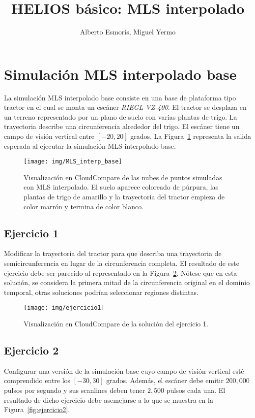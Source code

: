 \documentclass[]{article}
\title{HELIOS básico: MLS interpolado}
\author{Alberto Esmorís, Miguel Yermo}
\date{}
\begin{document}
	
	\maketitle
	
	
	
	\section*{Simulación MLS interpolado base}
	La simulación MLS interpolado base consiste en una base de plataforma tipo tractor en el cual se monta un escáner \textit{RIEGL VZ-400}. El tractor se desplaza en un terreno representado por un plano de suelo con varias plantas de trigo. La trayectoria describe una circunferencia alrededor del trigo. El escáner tiene un campo de visión vertical entre $[-20, 20]$ grados. La Figura~\ref{fig:mls_interp_base} representa la salida esperada al ejecutar la simulación MLS interpolado base.
	
	\begin{figure}[htb]
		\centering
		\texttt{[image: img/MLS\_interp\_base]}
		\caption{Visualización en CloudCompare de las nubes de puntos simuladas con MLS interpolado. El suelo aparece coloreado de púrpura, las plantas de trigo de amarillo y la trayectoria del tractor empieza de color marrón y termina de color blanco.}
		\label{fig:mls_interp_base}
	\end{figure}


	\pagebreak
	

	\subsection*{Ejercicio 1}
	Modificar la trayectoria del tractor para que describa una trayectoria de semicircunferencia en lugar de la circunferencia completa. El resultado de este ejercicio debe ser parecido al representado en la Figura~\ref{fig:ejercicio1}. Nótese que en esta solución, se considera la primera mitad de la circunferencia original en el dominio temporal, otras soluciones podrían seleccionar regiones distintas.
	
	\begin{figure}[htb]
		\centering
		\texttt{[image: img/ejercicio1]}
		\caption{Visualización en CloudCompare de la solución del ejercicio 1.}
		\label{fig:ejercicio1}
	\end{figure}


	\subsection*{Ejercicio 2}
	Configurar una versión de la simulación base cuyo campo de visión vertical esté comprendido entre los $[-30, 30]$ grados. Además, el escáner debe emitir $200,000$ pulsos por segundo y sus scanlines deben tener $2,500$ pulsos cada una. El resultado de dicho ejercicio debe asemejarse a lo que se muestra en la Figura~\ref{fig:ejercicio2}.
	
\end{document}
